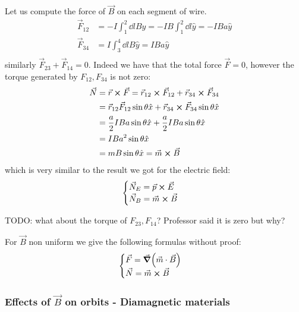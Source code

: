 \documentclass[12pt]{extarticle}
\begin{document}
Let us compute the force of $\vec B$ on each segment of wire.
\begin{align}
	\vec F_{12} & = -I \int_1^2 \dd l B \hat y = -I B \int_1^2 \dd l \hat y = - I B a \hat y \\
	\vec F_{34} & = I \int_3^4 \dd l B \hat y =  I B a \hat y                                \\
\end{align}
similarly $\vec F_{23} + \vec F_{14} = 0$.
Indeed we have that the total force $\vec F = 0$, however the torque generated by $F_{12}, F_{34}$ is not zero:
\begin{align}
	\vec N & = \vec r \cross \vec F = \vec r_{12} \cross \vec F_{12} + \vec r_{34} \cross \vec F_{34}        \\
	       & = \vec r_{12} \vec F_{12} \sin \theta \hat x+ \vec r_{34} \cross \vec F_{34} \sin \theta \hat x \\
	       & = \frac{a}{2} I B a \sin \theta \hat x + \frac{a}{2} I B a \sin \theta \hat x                   \\
	       & = I B a^2 \sin \theta \hat x                                                                    \\
	       & = m B \sin \theta \hat x = \vec m \cross \vec B
\end{align}
which is very similar to the result we got for the electric field:
\begin{equation}
	\begin{cases}
		\vec N_E = \vec p \cross \vec E \\
		\vec N_B = \vec m \cross \vec B
	\end{cases}
\end{equation}

TODO: what about the torque of $F_{23}, F_{14}$? Professor said it is zero but why?

For $\vec B$ non uniform we give the following formulas without proof:
\begin{equation}
	\begin{cases}
		\vec F = \grad(\vec m \cdot \vec B) \\
		\vec N = \vec m \cross \vec B
	\end{cases}
\end{equation}

\subsubsection{Effects of \texorpdfstring{$\vec B$}{B} on orbits - Diamagnetic materials}
\end{document}
